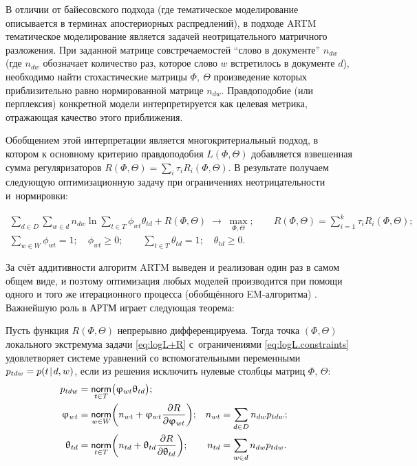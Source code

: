 В отличии от байесовского подхода (где тематическое моделирование описывается в терминах апостериорных распредлений), в подходе ARTM тематическое моделирование является задачей неотрицательного матричного разложения. При заданной матрице совстречаемостей ``слово в документе''  $n_{dw}$ (где $n_{dw}$ обозначает количество раз, которое слово  $w$ встретилось в документе $d$), необходимо найти стохастические матрицы $\Phi,~\Theta$ произведение которых приблизительно равно нормированной матрице $n_{dw}$. Правдоподобие (или перплексия) конкретной модели интерпретируется как целевая метрика, отражающая качество этого приближения.

Обобщением этой интерпретации является многокритериальный подход, в котором к основному критерию правдоподобия $L(\Phi, \Theta)$ 
добавляется взвешенная сумма регуляризаторов $R(\Phi, \Theta) = \sum_i \tau_i R_i(\Phi, \Theta)$. В результате получаем следующую оптимизационную задачу при ограничениях неотрицательности и~нормировки:

\begin{gather}
\label{eq:logL+R}
    \sum_{d\in D} \sum_{w\in d}
        n_{dw}\ln
        \sum_{t\in T}
            \phi_{wt}\theta_{td}
    + R(\Phi,\Theta)
    \;\to\; \max_{\Phi,\Theta};
    \qquad
    R(\Phi,\Theta)
    = \sum_{i=1}^k \tau_i R_i(\Phi,\Theta);
\\
\label{eq:logL.constraints}
    \sum_{w\in W} \phi_{wt} = 1;
    \quad
    \phi_{wt}\geq 0;
    \qquad
    \sum_{t\in T} \theta_{td} = 1;
    \quad
    \theta_{td}\geq 0.
\end{gather}

За счёт аддитивности алгоритм ARTM  выведен и реализован один раз в самом общем виде, и поэтому оптимизация любых моделей  производится при помощи одного и того же итерационного процесса  (обобщённого EM-алгоритма)  \cite{vorontsov2014additive,vorontsov2015}. Важнейшую роль в АРТМ играет следующая теорема:

\begin{Theorem}
\label{th:ARTM}
    Пусть функция $R(\Phi,\Theta)$ непрерывно дифференцируема.
    Тогда точка $(\Phi,\Theta)$ локального экстремума задачи
    \eqref{eq:logL+R} с~ограничениями \eqref{eq:logL.constraints}
    удовлетворяет системе уравнений со вспомогательными переменными $p_{tdw}=p(t\mspace{2mu}{|}\mspace{2mu} d,w)$,
    если из решения исключить нулевые столбцы матриц $\Phi$, $\Theta$:
    \begin{align}
    \label{eq:ARTM.Estep}
        p_{tdw} &=\mathop{\mathsf{norm}}\limits_{t\in T} \bigl( \upvarphi_{wt}\uptheta_{td} \bigr);
    \\\label{eq:ARTM.Mstep.phi}
        \upvarphi_{wt} &=\mathop{\mathsf{norm}}\limits_{w\in W}
            \biggl(
                n_{wt} + \upvarphi_{wt} \frac{\partial R}{\partial \upvarphi_{wt}}
            \biggr);
        &
        n_{wt} &= \sum_{d\in D} n_{dw}p_{tdw};&
    \\\label{eq:ARTM.Mstep.theta}
        \uptheta_{td} &=\mathop{\mathsf{norm}}\limits_{t\in T}
            \biggl(
                n_{td} + \uptheta_{td} \frac{\partial R}{\partial \uptheta_{td}}
            \biggr);
        &
        n_{td} &= \sum_{w\in d} n_{dw}p_{tdw}.&
    \end{align}
\end{Theorem}

